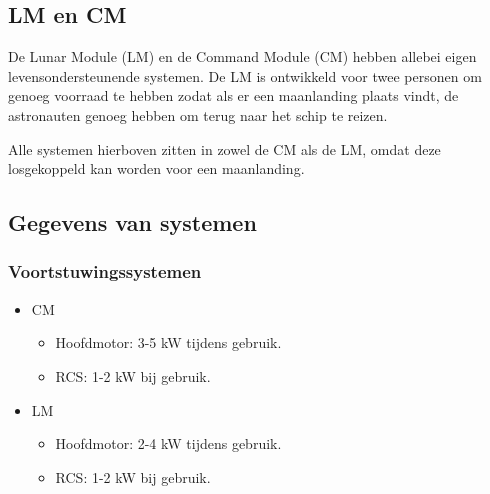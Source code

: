 \subsection{LM en CM}
De Lunar Module (LM) en de Command Module (CM) hebben allebei eigen levensondersteunende systemen. De LM is ontwikkeld voor twee personen om genoeg voorraad te hebben zodat als er een maanlanding plaats vindt, de astronauten genoeg hebben om terug naar het schip te reizen. 

Alle systemen hierboven zitten in zowel de CM als de LM, omdat deze losgekoppeld kan worden voor een maanlanding.


\subsection{Gegevens van systemen}

\subsubsection{Voortstuwingssystemen}
\begin{itemize}
    \item CM
    \begin{itemize}
        \item Hoofdmotor: 3-5 kW tijdens gebruik.
        \item RCS: 1-2 kW bij gebruik.
    \end{itemize}
    \item LM
    \begin{itemize}
        \item Hoofdmotor: 2-4 kW tijdens gebruik.
        \item RCS: 1-2 kW bij gebruik.
    \end{itemize}
\end{itemize}


